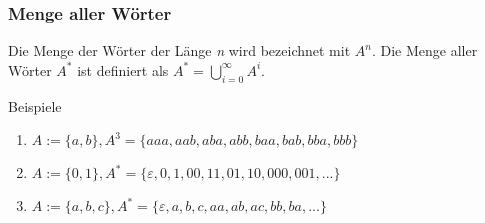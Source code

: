 \begin{frame}
  \frametitle{Menge aller Wörter}
  \begin{definition}
    Die Menge der Wörter der Länge \emph{n} wird bezeichnet mit $A^n$. Die Menge aller Wörter $A^*$ ist definiert als $A^* = \bigcup \limits^{\infty}_{i=0} A^i$.
  \end{definition}
  \begin{exampleblock}{Beispiele}
    \begin{enumerate}
      \item $A := \{a, b\}, A^3 = \{aaa, aab, aba, abb, baa, bab, bba, bbb\}$
      \item $A := \{0, 1\}, A^* = \{\varepsilon, 0, 1, 00, 11, 01, 10, 000, 001, ...\}$
      \item $A := \{a, b, c\}, A^* = \{\varepsilon, a, b, c, aa, ab, ac, bb, ba, ...\}$
    \end{enumerate}
  \end{exampleblock}
\end{frame}

